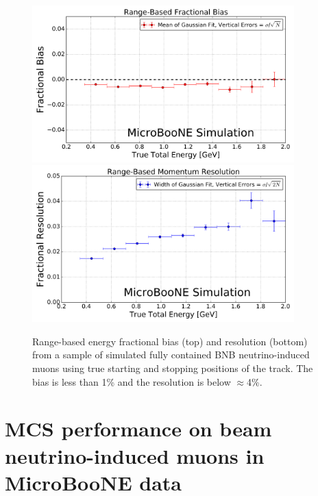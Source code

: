 \documentclass[a4paper,11pt]{article}
\begin{document}
\begin{figure}
\centering
\includegraphics[width=0.9\textwidth]
	{Figures/true_range_bias_MCBNBMCTrack.png}
\includegraphics[width=0.9\textwidth]
	{Figures/true_range_resolution_MCBNBMCTrack.png}
\caption{Range-based energy fractional bias (top) and resolution (bottom) from a sample of simulated fully contained BNB neutrino-induced muons using true starting and stopping positions of the track. The bias is less than 1\% and the resolution is below $\approx$4\%.}
\label{true_range_bias_resolution_MCTrack_fig}
\end{figure}






\section{MCS performance on beam neutrino-induced muons in MicroBooNE data}\label{data_performance_section}
\end{document}
